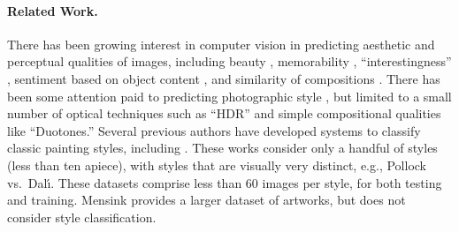 \paragraph{Related Work.}
There has been growing interest in computer vision in predicting aesthetic and perceptual qualities of images, including beauty \cite{Datta-ECCV-2006,Marchesotti-BMVC-2013,Murray-CVPR-2012}, memorability \cite{Isola-CVPR-2011}, ``interestingness'' \cite{Dhar-CVPR-2011,Gygli-ICCV-2013}, sentiment based on object content \cite{Borth-MM-2013}, and similarity of compositions \cite{gemert2011}.
There has been some attention paid to predicting photographic style \cite{Murray-CVPR-2012}, but limited to a small number of optical techniques such as ``HDR'' and simple compositional qualities like ``Duotones.''
Several previous authors have developed systems to classify classic painting styles, including \cite{keren2002,shamir2010}.
These works consider only a handful of styles (less than ten apiece), with styles that are visually very distinct, e.g., Pollock vs.~Dal\'{\i}.
These datasets comprise less than 60 images per style, for both testing and training.
Mensink \cite{Mensink2014} provides a larger dataset of artworks, but does not consider style classification.
